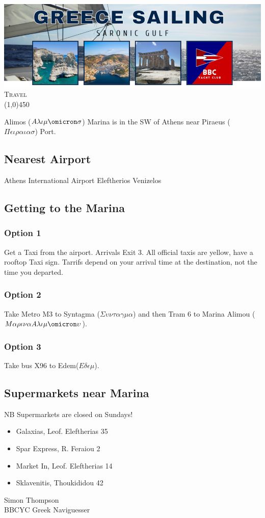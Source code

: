 \documentclass[12pt,a4paper,oneside]{article}
\begin{document}

\begin{center}
\includegraphics[scale=0.5]{../images/saronic_header_small.png} \\[0.2cm]
{\Large \textsc{Travel}}\\
\line(1,0){450}
\end{center}

Alimos ($ A\lambda\iota\mu\omicron\sigma $) Marina is in the SW of Athens near Piraeus ($ \Pi\epsilon\iota\rho\alpha\iota\alpha\sigma $) Port.

\subsection*{Nearest Airport}
Athens International Airport Eleftherios Venizelos

\subsection*{Getting to the Marina}
\subsubsection*{Option 1}
Get a Taxi from the airport.  Arrivals Exit 3.  All official taxis are yellow, have a rooftop Taxi sign.  Tarrifs depend on your arrival time at the destination, not the time you departed.
\subsubsection*{Option 2}
Take Metro M3 to Syntagma ($\Sigma\upsilon\nu\tau\alpha\gamma\mu\alpha$) and then Tram 6 to Marina Alimou ($M\alpha\rho\iota\nu\alpha A\lambda\iota\mu\omicron\upsilon $).
\subsubsection*{Option 3}
Take bus X96 to Edem($E\delta\epsilon\mu$).

\subsection*{Supermarkets near Marina}
NB Supermarkets are closed on Sundays!
\begin{itemize}
\item Galaxias, Leof. Eleftherias 35
\item Spar Express, R. Feraiou 2
\item Market In, Leof. Eleftherias 14
\item Sklavenitis, Thoukididou 42
\end{itemize}

\noindent Simon Thompson\\
BBCYC Greek Naviguesser
\end{document}
